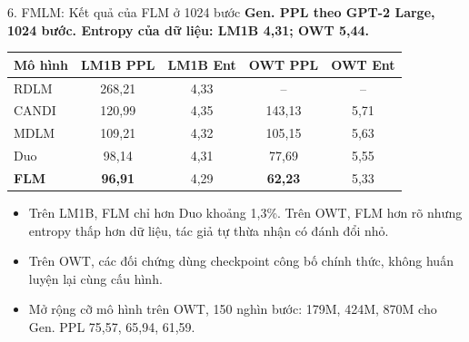 \begin{frame}{6. FMLM: Kết quả của FLM ở 1024 bước}
    \textbf{Gen. PPL theo GPT-2 Large, 1024 bước. Entropy của dữ liệu: LM1B 4,31; OWT 5,44.}
    \begin{table}[h]
        \centering
        \small
        \begin{tabular}{lcccc}
            \toprule
            \textbf{Mô hình} & \textbf{LM1B PPL} & \textbf{LM1B Ent} & \textbf{OWT PPL} & \textbf{OWT Ent} \\
            \midrule
            RDLM & 268,21 & 4,33 & -- & -- \\
            CANDI & 120,99 & 4,35 & 143,13 & 5,71 \\
            MDLM & 109,21 & 4,32 & 105,15 & 5,63 \\
            Duo & 98,14 & 4,31 & 77,69 & 5,55 \\
            \midrule
            \textbf{FLM} & \textbf{96,91} & 4,29 & \textbf{62,23} & 5,33 \\
            \bottomrule
        \end{tabular}
    \end{table}
    \vspace{-0.2cm}
    \begin{itemize}
        \item Trên LM1B, FLM chỉ hơn Duo khoảng 1,3\%. Trên OWT, FLM hơn rõ nhưng entropy thấp hơn dữ liệu, tác giả tự thừa nhận có đánh đổi nhỏ.
        \item Trên OWT, các đối chứng dùng checkpoint công bố chính thức, không huấn luyện lại cùng cấu hình.
        \item Mở rộng cỡ mô hình trên OWT, 150 nghìn bước: 179M, 424M, 870M cho Gen. PPL 75,57, 65,94, 61,59.
    \end{itemize}
\end{frame}

